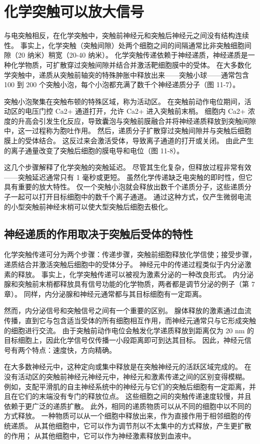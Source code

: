 \section{化学突触可以放大信号}
与电突触相反，在化学突触中，突触前神经元和突触后神经元之间没有结构连续性。 事实上，化学突触（突触间隙）处两个细胞之间的间隔通常比非突触细胞间隙（20 纳米）稍宽（20-40 纳米）。 化学突触传递依赖于神经递质，神经递质是一种化学物质，可扩散穿过突触间隙并结合并激活靶细胞膜中的受体。 在大多数化学突触中，递质从突触前轴突的特殊肿胀中释放出来——突触小球——通常包含 100 到 200 个突触小泡，每个小泡都充满了数千个神经递质分子（图 11-7）。

突触小泡聚集在突触布顿的特殊区域，称为活动区。 在突触前动作电位期间，活动区的电压门控 Ca2+ 通道打开，允许 Ca2+ 进入突触前末梢。 细胞内 Ca2+ 浓度的升高会引发生化反应，导致囊泡与突触前膜融合并将神经递质释放到突触间隙中，这一过程称为胞吐作用。 然后，递质分子扩散穿过突触间隙并与突触后细胞膜上的受体结合。 这反过来会激活受体，导致离子通道的打开或关闭。 由此产生的离子通量改变了突触后细胞的膜电导和电位（图 11-8）。

这几个步骤解释了化学突触的突触延迟。 尽管其生化复杂，但释放过程非常有效——突触延迟通常只有 1 毫秒或更短。 虽然化学传递缺乏电突触的即时性，但它具有重要的放大特性。 仅一个突触小泡就会释放出数千个递质分子，这些递质分子一起可以打开目标细胞中的数千个离子通道。 通过这种方式，仅产生微弱电流的小型突触前神经末梢可以使大型突触后细胞去极化。


\subsection{神经递质的作用取决于突触后受体的特性}
化学突触传递可分为两个步骤：传递步骤，突触前细胞释放化学信使；接受步骤，递质结合并激活突触后细胞中的受体分子。 神经元中的传递过程类似于内分泌激素的释放。 事实上，化学突触传递可以被视为激素分泌的一种改良形式。 内分泌腺和突触前末梢都释放具有信号功能的化学物质，两者都是调节分泌的例子（第 7 章）。 同样，内分泌腺和神经元通常都与其目标细胞有一定距离。

然而，内分泌信号和突触信号之间有一个重要的区别。 腺体释放的激素通过血流传播，直到它与包含适当受体的所有细胞相互作用，而神经元通常只与它形成突触的细胞进行交流。 由于突触前动作电位会触发化学递质释放到距离仅为 20 nm 的目标细胞上，因此化学信号仅传播一小段距离即可到达其目标。 因此，神经元信号有两个特点：速度快，方向精确。

在大多数神经元中，这种定向或集中释放是在突触神经元的活跃区域完成的。 在没有活动区的突触前神经元神经元中，神经元和激素传递之间的区别变得模糊。 例如，支配平滑肌的自主神经系统中的神经元与它们的突触后细胞有一定距离，并且在它们的末端没有专门的释放位点。 这些细胞之间的突触传递速度较慢，并且依赖于更广泛的递质扩散。 此外，相同的递质物质可以从不同的细胞中以不同的方式释放。 一种物质可以从一个细胞中释放出来，作为直接作用于相邻细胞的传统递质。 从其他细胞中，它可以作为调节剂以不太集中的方式释放，产生更扩散的作用； 从其他细胞中，它可以作为神经激素释放到血液中。

